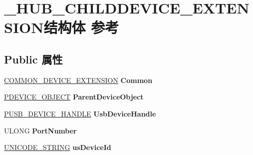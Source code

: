 \hypertarget{struct___h_u_b___c_h_i_l_d_d_e_v_i_c_e___e_x_t_e_n_s_i_o_n}{}\section{\+\_\+\+H\+U\+B\+\_\+\+C\+H\+I\+L\+D\+D\+E\+V\+I\+C\+E\+\_\+\+E\+X\+T\+E\+N\+S\+I\+O\+N结构体 参考}
\label{struct___h_u_b___c_h_i_l_d_d_e_v_i_c_e___e_x_t_e_n_s_i_o_n}
\subsection*{Public 属性}
\begin{DoxyCompactItemize}
\item 
\mbox{\label{struct___h_u_b___c_h_i_l_d_d_e_v_i_c_e___e_x_t_e_n_s_i_o_n_a3786d10478be858b5bf4a3bc2580501c}} 
\hyperlink{struct_c_o_m_m_o_n___d_e_v_i_c_e___e_x_t_e_n_s_i_o_n}{C\+O\+M\+M\+O\+N\+\_\+\+D\+E\+V\+I\+C\+E\+\_\+\+E\+X\+T\+E\+N\+S\+I\+ON} {\bfseries Common}
\item 
\mbox{\label{struct___h_u_b___c_h_i_l_d_d_e_v_i_c_e___e_x_t_e_n_s_i_o_n_a87ae8134c2ee34befc297dda8f340f3c}} 
\hyperlink{struct___d_e_v_i_c_e___o_b_j_e_c_t}{P\+D\+E\+V\+I\+C\+E\+\_\+\+O\+B\+J\+E\+CT} {\bfseries Parent\+Device\+Object}
\item 
\mbox{\label{struct___h_u_b___c_h_i_l_d_d_e_v_i_c_e___e_x_t_e_n_s_i_o_n_ad5607cfd317c0b4b88ef60da77d92cd6}} 
\hyperlink{interfacevoid}{P\+U\+S\+B\+\_\+\+D\+E\+V\+I\+C\+E\+\_\+\+H\+A\+N\+D\+LE} {\bfseries Usb\+Device\+Handle}
\item 
\mbox{\label{struct___h_u_b___c_h_i_l_d_d_e_v_i_c_e___e_x_t_e_n_s_i_o_n_a1b74763e67d2b36088719da6c658983f}} 
U\+L\+O\+NG {\bfseries Port\+Number}
\item 
\mbox{\label{struct___h_u_b___c_h_i_l_d_d_e_v_i_c_e___e_x_t_e_n_s_i_o_n_a845ef1bf197d0e2861fda77bb3a9b338}} 
\hyperlink{struct___u_n_i_c_o_d_e___s_t_r_i_n_g}{U\+N\+I\+C\+O\+D\+E\+\_\+\+S\+T\+R\+I\+NG} {\bfseries us\+Device\+Id}

\end{DoxyCompactItemize}
